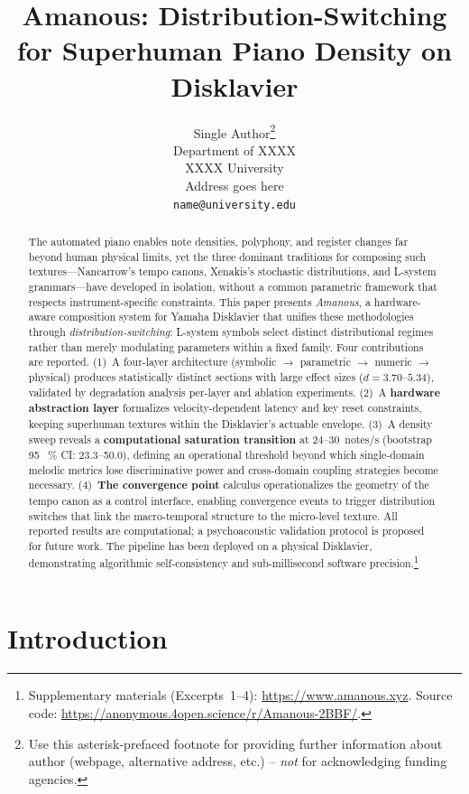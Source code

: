 \documentclass[a4paper]{article}
\title{Amanous: Distribution-Switching for Superhuman Piano Density on Disklavier}
\author{%
  Single Author\thanks{Use this asterisk-prefaced footnote for providing further information about author (webpage, alternative address, etc.) -- \textit{not} for acknowledging funding agencies.} \\
  Department of XXXX \\
  XXXX University \\
  Address goes here \\
  \texttt{name@university.edu} \\
}
\theoremstyle{definition}
\theoremstyle{remark}
\begin{document}
\maketitle

\begin{abstract}
The automated piano enables note densities, polyphony, and register changes far beyond human physical limits, yet the three dominant traditions for composing such textures---Nancarrow's tempo canons, Xenakis's stochastic distributions, and L-system grammars---have developed in isolation, without a common parametric framework that respects instrument-specific constraints. This paper presents \emph{Amanous}, a hardware-aware composition system for Yamaha Disklavier that unifies these methodologies through \emph{distribution-switching}: L-system symbols select distinct distributional regimes rather than merely modulating parameters within a fixed family. Four contributions are reported. (1)~A four-layer architecture (symbolic $\rightarrow$ parametric $\rightarrow$ numeric $\rightarrow$ physical) produces statistically distinct sections with large effect sizes ($d = 3.70$--$5.34$), validated by degradation analysis per-layer and ablation experiments. (2)~A \textbf{hardware abstraction layer} formalizes velocity-dependent latency and key reset constraints, keeping superhuman textures within the Disklavier's actuable envelope. (3)~A density sweep reveals a \textbf{computational saturation transition} at 24--30~notes/s (bootstrap 95 \, \% CI: 23.3--50.0), defining an operational threshold beyond which single-domain melodic metrics lose discriminative power and cross-domain coupling strategies become necessary. (4)~\textbf{The convergence point} calculus operationalizes the geometry of the tempo canon as a control interface, enabling convergence events to trigger distribution switches that link the macro-temporal structure to the micro-level texture. All reported results are computational; a psychoacoustic validation protocol is proposed for future work. The pipeline has been deployed on a physical Disklavier, demonstrating algorithmic self-consistency and sub-millisecond software precision.\footnote{Supplementary materials (Excerpts~1--4): \url{https://www.amanous.xyz}. Source code: \url{https://anonymous.4open.science/r/Amanous-2BBF/}.}
\end{abstract}

\section{Introduction}
\label{sec:intro}
\end{document}
